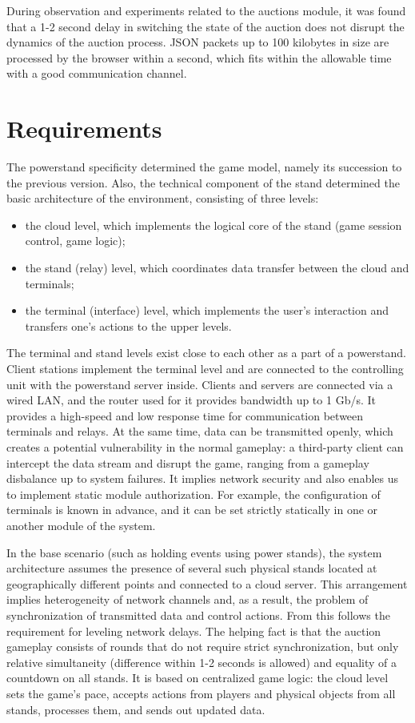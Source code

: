 \documentclass[
]{ceurart}
\begin{document}
During observation and experiments related to the auctions module, it was found that a 1-2 second delay in switching the state of the auction does not disrupt the dynamics of the auction process. JSON packets up to 100 kilobytes in size are processed by the browser within a second, which fits within the allowable time with a good communication channel.


\section{Requirements}
\label{sec:reqs}


The powerstand specificity determined the game model, namely its succession to the previous version. Also, the technical component of the stand determined the basic architecture of the environment, consisting of three levels:
\begin{itemize}
\item the cloud level, which implements the logical core of the stand (game session control, game logic);
\item  the stand (relay) level, which coordinates data transfer between the cloud and terminals;
\item  the terminal (interface) level, which implements the user’s interaction and transfers one's actions to the upper levels.
\end{itemize}

The terminal and stand levels exist close to each other as a part of a powerstand. Client stations implement the terminal level and are connected to the controlling unit with the powerstand server inside. Clients and servers are connected via a wired LAN, and the router used for it provides bandwidth up to 1 Gb/s. It provides a high-speed and low response time for communication between terminals and relays. At the same time, data can be transmitted openly, which creates a potential vulnerability in the normal gameplay: a third-party client can intercept the data stream and disrupt the game, ranging from a gameplay disbalance up to system failures. It implies network security and also enables us to implement static module authorization. For example, the configuration of terminals is known in advance, and it can be set strictly statically in one or another module of the system.

In the base scenario (such as holding events using power stands), the system architecture assumes the presence of several such physical stands located at geographically different points and connected to a cloud server. This arrangement implies heterogeneity of network channels and, as a result, the problem of synchronization of transmitted data and control actions. From this follows the requirement for leveling network delays. The helping fact is that the auction gameplay consists of rounds that do not require strict synchronization, but only relative simultaneity (difference within 1-2 seconds is allowed) and equality of a countdown on all stands. It is based on centralized game logic: the cloud level sets the game’s pace, accepts actions from players and physical objects from all stands, processes them, and sends out updated data.
\end{document}
